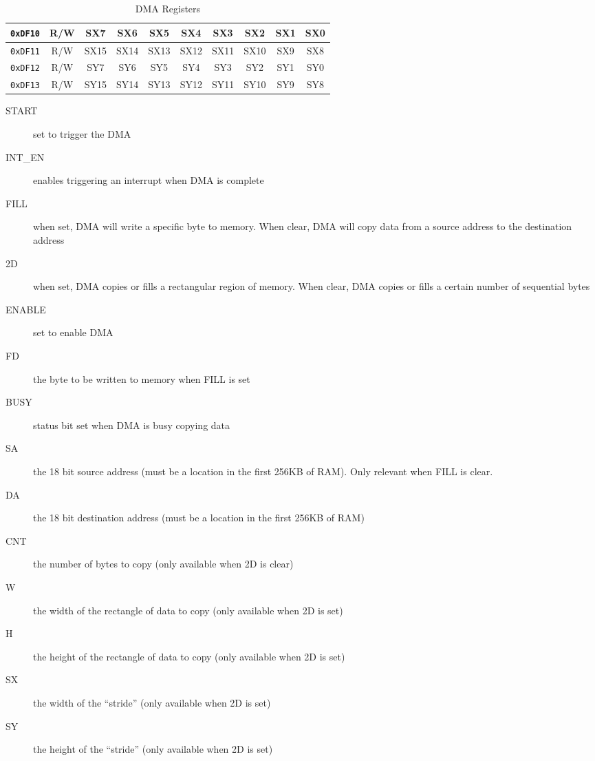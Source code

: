 \begin{table}[h]
\begin{center}
\begin{tabular}{|c|c|c|c|c|c|c|c|c|c|}
            \verb+0xDF10+ & R/W & SX7 & SX6 & SX5 & SX4 & SX3 & SX2 & SX1 & SX0 \\ \hline
            \verb+0xDF11+ & R/W & SX15 & SX14 & SX13 & SX12 & SX11 & SX10 & SX9 & SX8 \\ \hline

            \verb+0xDF12+ & R/W & SY7 & SY6 & SY5 & SY4 & SY3 & SY2 & SY1 & SY0 \\ \hline
            \verb+0xDF13+ & R/W & SY15 & SY14 & SY13 & SY12 & SY11 & SY10 & SY9 & SY8 \\ \hline
        \end{tabular}
    \end{center}
    \caption{DMA Registers}
    \label{tab:dma_reg}
\end{table}

\begin{description}
    \item[START] set to trigger the DMA

    \item[INT\_EN] enables triggering an interrupt when DMA is complete

    \item[FILL] when set, DMA will write a specific byte to memory. When clear, DMA will copy data from a source address to the destination address

    \item[2D] when set, DMA copies or fills a rectangular region of memory. When clear, DMA copies or fills a certain number of sequential bytes

    \item[ENABLE] set to enable DMA

    \item[FD] the byte to be written to memory when FILL is set

    \item[BUSY] status bit set when DMA is busy copying data

    \item[SA] the 18 bit source address (must be a location in the first 256KB of RAM). Only relevant when FILL is clear.

    \item[DA] the 18 bit destination address (must be a location in the first 256KB of RAM)

    \item[CNT] the number of bytes to copy (only available when 2D is clear)

    \item[W] the width of the rectangle of data to copy (only available when 2D is set)

    \item[H] the height of the rectangle of data to copy (only available when 2D is set)

    \item[SX] the width of the ``stride'' (only available when 2D is set)

    \item[SY] the height of the ``stride'' (only available when 2D is set)
\end{description}
